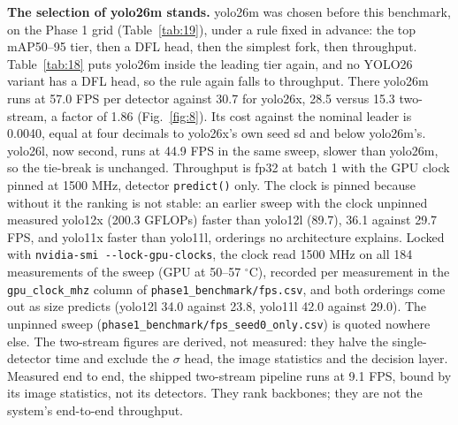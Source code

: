 \documentclass[journal,onecolumn]{IEEEtran}
\begin{document}
\textbf{The selection of yolo26m stands.} yolo26m was chosen before this benchmark, on the Phase 1 grid (Table~\ref{tab:19}), under a rule fixed in advance: the top mAP50--95 tier, then a DFL head, then the simplest fork, then throughput. Table~\ref{tab:18} puts yolo26m inside the leading tier again, and no YOLO26 variant has a DFL head, so the rule again falls to throughput. There yolo26m runs at 57.0 FPS per detector against 30.7 for yolo26x, 28.5 versus 15.3 two-stream, a factor of 1.86 (Fig.~\ref{fig:8}). Its cost against the nominal leader is 0.0040, equal at four decimals to yolo26x's own seed sd and below yolo26m's. yolo26l, now second, runs at 44.9 FPS in the same sweep, slower than yolo26m, so the tie-break is unchanged. Throughput is fp32 at batch 1 with the GPU clock pinned at 1500 MHz, detector \texttt{predict()} only. The clock is pinned because without it the ranking is not stable: an earlier sweep with the clock unpinned measured yolo12x (200.3 GFLOPs) faster than yolo12l (89.7), 36.1 against 29.7 FPS, and yolo11x faster than yolo11l, orderings no architecture explains. Locked with \texttt{nvidia-\allowbreak{}smi -\allowbreak{}-\allowbreak{}lock-\allowbreak{}gpu-\allowbreak{}clocks}, the clock read 1500 MHz on all 184 measurements of the sweep (GPU at 50--57 $^{\circ}$C), recorded per measurement in the \texttt{gpu\_\allowbreak{}clock\_\allowbreak{}mhz} column of \texttt{phase1\_\allowbreak{}benchmark/\allowbreak{}fps.csv}, and both orderings come out as size predicts (yolo12l 34.0 against 23.8, yolo11l 42.0 against 29.0). The unpinned sweep (\texttt{phase1\_\allowbreak{}benchmark/\allowbreak{}fps\_\allowbreak{}seed0\_\allowbreak{}only.csv}) is quoted nowhere else. The two-stream figures are derived, not measured: they halve the single-detector time and exclude the $\sigma$ head, the image statistics and the decision layer. Measured end to end, the shipped two-stream pipeline runs at 9.1 FPS, bound by its image statistics, not its detectors. They rank backbones; they are not the system's end-to-end throughput.
\end{document}
